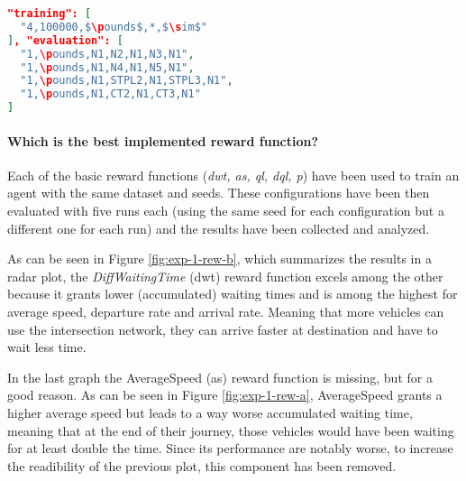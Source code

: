 \noindent
\begin{minipage}{\linewidth}
\begin{lstlisting}[language=JSON, caption=The schema for the "Monolithic" Dataset, label={lst:dataset-schema-monolithic}, mathescape=true]
"training": [
  "4,100000,$\pounds$,*,$\sim$"
], "evaluation": [
  "1,\pounds,N1,N2,N1,N3,N1",
  "1,\pounds,N1,N4,N1,N5,N1",
  "1,\pounds,N1,STPL2,N1,STPL3,N1",
  "1,\pounds,N1,CT2,N1,CT3,N1"
]
\end{lstlisting}
\end{minipage}

\paragraph{Which is the best implemented reward function?}

Each of the basic reward functions (\textit{dwt, as, ql, dql, p}) have been used to train an agent with the same dataset and seeds.
These configurations have been then evaluated with five runs each (using the same seed for each configuration but a different one for each run) and the results have been collected and analyzed.

As can be seen in Figure \ref{fig:exp-1-rew-b}, which summarizes the results in a radar plot, the \textit{DiffWaitingTime} (dwt) reward function excels among the other because it grants lower (accumulated) waiting times and is among the highest for average speed, departure rate and arrival rate.
Meaning that more vehicles can use the intersection network, they can arrive faster at destination and have to wait less time.

In the last graph the AverageSpeed (as) reward function is missing, but for a good reason.
As can be seen in Figure \ref{fig:exp-1-rew-a}, AverageSpeed grants a higher average speed but leads to a way worse accumulated waiting time, meaning that at the end of their journey, those vehicles would have been waiting for at least double the time.
Since its performance are notably worse, to increase the readibility of the previous plot, this component has been removed.



